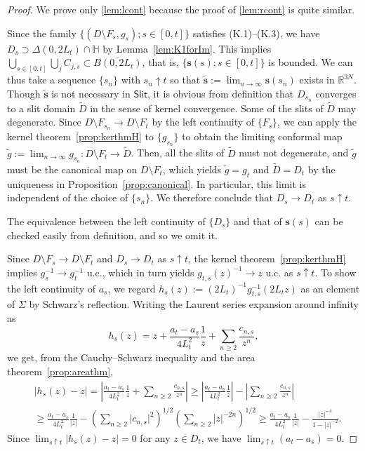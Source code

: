 \documentclass[preprint,12pt]{elsarticle}
\theoremstyle{definition}
\newcommand{\R}{\mathbb{R}}
\newcommand{\uhp}{\mathbb{H}}
\newcommand{\Slit}{\mathsf{Slit}}
\newcommand{\slit}{\mathbf{s}}
\begin{document}
\begin{proof}
We prove only \eqref{lem:lcont}
because the proof of \eqref{lem:rcont} is quite similar.

Since the family $\{(D \setminus F_s, g_s); s \in [0, t]\}$
satisfies (K.1)--(K.3),
we have $D_s \supset \Delta(0, 2L_t) \cap \uhp$ by Lemma~\ref{lem:K1forIm}.
This implies $\bigcup_{s \in [0,t]} \bigcup_j C_{j,s} \subset \overline{B(0,2L_t)}$,
that is, $\{\slit(s); s \in [0, t]\}$ is bounded.
We can thus take a sequence $\{s_n\}$ with $s_n \uparrow t$ so that
$\widetilde{\slit}:=\lim_{n \to \infty}\slit(s_n)$ exists in $\R^{3N}$.
Though $\widetilde{\slit}$ is not necessary in $\Slit$,
it is obvious from definition that $D_{s_n}$ converges to a slit domain $\tilde{D}$
in the sense of kernel convergence.
Some of the slits of $\tilde{D}$ may degenerate.
Since $D \setminus F_{s_n} \to D \setminus F_t$ by the left continuity of $\{F_s\}$,
we can apply the kernel theorem~\ref{prop:kerthmH} to $\{g_{s_n}\}$
to obtain the limiting conformal map
$\tilde{g}:=\lim_{n \to \infty}g_{s_n} \colon D \setminus F_t \to \tilde{D}$.
Then, all the slits of $\tilde{D}$ must not degenerate, and
$\tilde{g}$ must be the canonical map on $D \setminus F_t$,
which yields $\tilde{g} = g_t$ and $\tilde{D} = D_t$
by the uniqueness in Proposition~\ref{prop:canonical}.
In particular, this limit is independent of the choice of $\{s_n\}$.
We therefore conclude that $D_s \to D_t$ as $s \uparrow t$.

The equivalence between the left continuity of $\{D_s\}$ and that of $\slit(s)$
can be checked easily from definition, and so we omit it.

Since $D \setminus F_s \to D \setminus F_t$ and $D_s \to D_t$ as $s \uparrow t$,
the kernel theorem~\ref{prop:kerthmH} implies $g_s^{-1} \to g_t^{-1}$ u.c.,
which in turn yields $g_{t,s}(z)^{-1} \to z$ u.c. as $s \uparrow t$.
To show the left continuity of $a_s$, we regard $h_s(z):=(2L_t)^{-1}g_{t,s}^{-1}(2L_tz)$
as an element of $\Sigma$ by Schwarz's reflection.
Writing the Laurent series expansion around infinity as
\[
h_s(z)=z+\frac{a_t-a_s}{4L_t^2}\frac{1}{z}+\sum_{n \geq 2}\frac{c_{n,s}}{z^n},
\]
we get, from the Cauchy--Schwarz inequality
and the area theorem~\ref{prop:areathm},
\begin{align*}
&\left\lvert h_s(z)-z \right\rvert
= \left\lvert \frac{a_t-a_s}{4L_t^2}\frac{1}{z}
	+ \sum_{n \geq 2}\frac{c_{n,s}}{z^n} \right\rvert
\geq \left\lvert \frac{a_t-a_s}{4L_t^2}\frac{1}{z} \right\rvert
	- \left\lvert \sum_{n \geq 2}\frac{c_{n,s}}{z^n} \right\rvert \\
&\geq \frac{a_t-a_s}{4L_t^2}\frac{1}{\lvert z \rvert}
	- \left(\sum_{n \geq 2}\lvert c_{n,s} \rvert^2\right)^{1/2}
	\left(\sum_{n \geq 2}\lvert z \rvert^{-2n}\right)^{1/2}
\geq \frac{a_t-a_s}{4L_t^2}\frac{1}{\lvert z \rvert}
	- \frac{\lvert z \rvert^{-4}}{1-\lvert z \rvert^{-2}}.
\end{align*}
Since $\lim_{s \uparrow t}\lvert h_s(z)-z \rvert = 0$ for any $z \in D_t$,
we have $\lim_{s \uparrow t}(a_t - a_s)=0$.
\end{proof}
\end{document}
